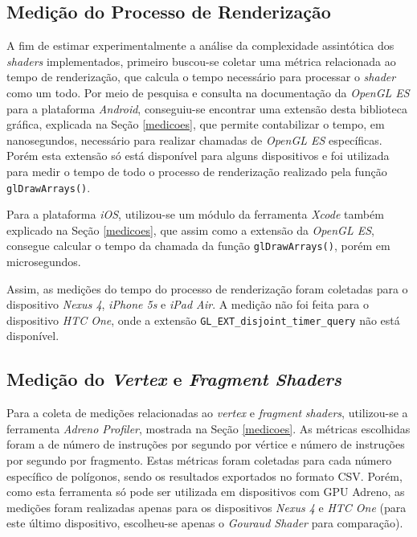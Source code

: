 \subsection{Medição do Processo de Renderização}
\label{gpu}

	A fim de estimar experimentalmente a análise da complexidade assintótica dos \textit{shaders} implementados, primeiro buscou-se coletar uma métrica relacionada ao tempo de renderização, que calcula o tempo necessário para processar o \textit{shader} como um todo. Por meio de pesquisa e consulta na documentação da \textit{OpenGL ES} para a plataforma \textit{Android}, conseguiu-se encontrar uma extensão desta biblioteca gráfica, explicada na Seção \ref{medicoes}, que permite contabilizar o tempo, em nanosegundos, necessário para realizar chamadas de \textit{OpenGL ES} específicas. Porém esta extensão só está disponível para alguns dispositivos e foi utilizada para medir o tempo de todo o processo de renderização realizado pela função \texttt{glDrawArrays()}.

	Para a plataforma \textit{iOS}, utilizou-se um módulo da ferramenta \textit{Xcode} também explicado na Seção \ref{medicoes}, que assim como a extensão da \textit{OpenGL ES}, consegue calcular o tempo da chamada da função \texttt{glDrawArrays()}, porém em microsegundos.  

	Assim, as medições do tempo do processo de renderização foram coletadas para o dispositivo \textit{Nexus 4}, \textit{iPhone 5s} e \textit{iPad Air}. A medição não foi feita para o dispositivo \textit{HTC One}, onde a extensão \texttt{GL\_EXT\_disjoint\_timer\_query} não está disponível.

\subsection{Medição do \textit{Vertex} e  \textit{Fragment Shaders}}

	Para a coleta de medições relacionadas ao \textit{vertex} e \textit{fragment} \textit{shaders}, utilizou-se a ferramenta \textit{Adreno Profiler}, mostrada na Seção \ref{medicoes}. As métricas escolhidas foram a de número de instruções por segundo por vértice e número de instruções por segundo por fragmento. Estas métricas foram coletadas para cada número específico de polígonos, sendo os resultados exportados no formato CSV. Porém, como esta ferramenta só pode ser utilizada em dispositivos com GPU Adreno, as medições foram realizadas apenas para os dispositivos \textit{Nexus 4} e \textit{HTC One} (para este último dispositivo, escolheu-se apenas o \textit{Gouraud Shader} para comparação). 

